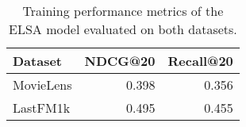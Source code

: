 \begin{table}
\caption{Training performance metrics of the ELSA model evaluated on both datasets.}
\label{tab:elsa:results}
\begin{tabular}{lrr}
\toprule
Dataset & NDCG@20 & Recall@20 \\
\midrule
MovieLens & 0.398 & 0.356 \\
LastFM1k & 0.495 & 0.455 \\
\bottomrule
\end{tabular}
\end{table}
